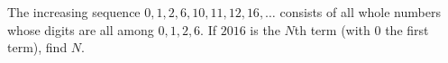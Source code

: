 The increasing sequence $0,1,2,6,10,11,12,16,\dots$ consists of all whole numbers whose digits are all among $0,1,2,6$. If $2016$ is the $N$th term (with $0$ the first term), find $N$.
